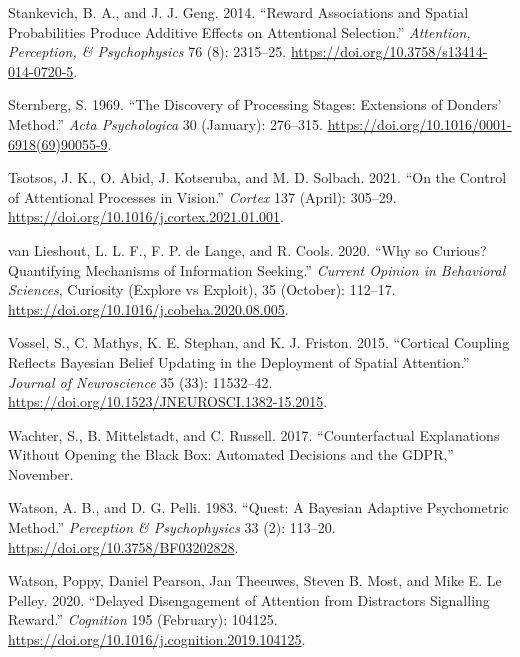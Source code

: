\documentclass[11pt,halfline,a4paper,]{ouparticle}
\newlength{\cslhangindent}
\newlength{\cslentryspacingunit} %
\newenvironment{CSLReferences}[2] %
 {%
  \setlength{\parindent}{0pt}
  \ifodd #1
  \let\oldpar\par
  \def\par{\hangindent=\cslhangindent\oldpar}
  \fi
  \setlength{\parskip}{#2\cslentryspacingunit}
 }%
 {}
\begin{document}
\begin{CSLReferences}{1}{0}
\leavevmode{}%
Stankevich, B. A., and J. J. Geng. 2014. {``Reward Associations and Spatial Probabilities Produce Additive Effects on Attentional Selection.''} \emph{Attention, Perception, \& Psychophysics} 76 (8): 2315--25. \url{https://doi.org/10.3758/s13414-014-0720-5}.

\leavevmode{}%
Sternberg, S. 1969. {``The Discovery of Processing Stages: {Extensions} of {Donders}' Method.''} \emph{Acta Psychologica} 30 (January): 276--315. \url{https://doi.org/10.1016/0001-6918(69)90055-9}.

\leavevmode{}%
Tsotsos, J. K., O. Abid, J. Kotseruba, and M. D. Solbach. 2021. {``On the Control of Attentional Processes in Vision.''} \emph{Cortex} 137 (April): 305--29. \url{https://doi.org/10.1016/j.cortex.2021.01.001}.

\leavevmode{}%
van Lieshout, L. L. F., F. P. de Lange, and R. Cools. 2020. {``Why so Curious? {Quantifying} Mechanisms of Information Seeking.''} \emph{Current Opinion in Behavioral Sciences}, Curiosity ({Explore} vs {Exploit}), 35 (October): 112--17. \url{https://doi.org/10.1016/j.cobeha.2020.08.005}.

\leavevmode{}%
Vossel, S., C. Mathys, K. E. Stephan, and K. J. Friston. 2015. {``Cortical {Coupling Reflects Bayesian Belief Updating} in the {Deployment} of {Spatial Attention}.''} \emph{Journal of Neuroscience} 35 (33): 11532--42. \url{https://doi.org/10.1523/JNEUROSCI.1382-15.2015}.

\leavevmode{}%
Wachter, S., B. Mittelstadt, and C. Russell. 2017. {``Counterfactual {Explanations} Without {Opening} the {Black Box}: {Automated Decisions} and the {GDPR},''} November.

\leavevmode{}%
Watson, A. B., and D. G. Pelli. 1983. {``Quest: {A Bayesian} Adaptive Psychometric Method.''} \emph{Perception \& Psychophysics} 33 (2): 113--20. \url{https://doi.org/10.3758/BF03202828}.

\leavevmode{}%
Watson, Poppy, Daniel Pearson, Jan Theeuwes, Steven B. Most, and Mike E. Le Pelley. 2020. {``Delayed Disengagement of Attention from Distractors Signalling Reward.''} \emph{Cognition} 195 (February): 104125. \url{https://doi.org/10.1016/j.cognition.2019.104125}.


\end{CSLReferences}
\end{document}
